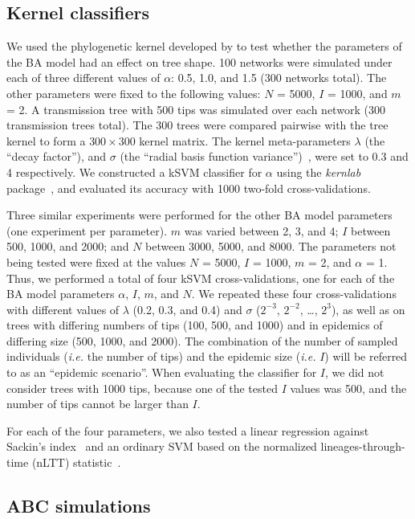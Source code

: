 \documentclass[nogrid]{MBE}
\begin{document}
\subsection{Kernel classifiers}
  
We used the phylogenetic kernel developed by \citet{poon2013mapping} to test
whether the parameters of the BA model had an effect on tree shape. 100
networks were simulated under each of three different values of $\alpha$: 0.5,
1.0, and 1.5 (300 networks total). The other parameters were fixed to the
following values: $N$ = 5000, $I$ = 1000, and $m$ = 2. A transmission tree with
500 tips was simulated over each network (300 transmission trees total). The
300 trees were compared pairwise with the tree kernel to form a $300 \times
300$ kernel matrix. The kernel meta-parameters $\lambda$ (the ``decay
factor''), and $\sigma$ (the ``radial basis function
variance'')~\citep[see][]{poon2013mapping}, were set to 0.3 and 4 respectively.
We constructed a kSVM classifier for $\alpha$ using the \textit{kernlab}
package~\citep{zeileis2004kernlab}, and evaluated its accuracy with 1000
two-fold cross-validations.
  
Three similar experiments were performed for the other BA model parameters (one
experiment per parameter). $m$ was varied between 2, 3, and 4; $I$ between 500,
1000, and 2000; and $N$ between 3000, 5000, and 8000. The parameters not being
tested were fixed at the values $N$ = 5000, $I$ = 1000, $m$ = 2, and $\alpha$ =
1. Thus, we performed a total of four kSVM cross-validations, one for each of
the BA model parameters $\alpha$, $I$, $m$, and $N$. We repeated these four
cross-validations with different values of $\lambda$ (0.2, 0.3, and 0.4) and
$\sigma$ ($2^{-3}$, $2^{-2}$, \ldots, $2^3$), as well as on trees with
differing numbers of tips (100, 500, and 1000) and in epidemics of differing
size (500, 1000, and 2000). The combination of the number of sampled
individuals (\textit{i.e.} the number of tips) and the epidemic size
(\textit{i.e.} $I$) will be referred to as an ``epidemic scenario''. When
evaluating the classifier for $I$, we did not consider trees with 1000 tips,
because one of the tested $I$ values was 500, and the number of tips cannot be
larger than $I$.
  
For each of the four parameters, we also tested a linear regression against
Sackin's index~\citep{shao1990tree} and an ordinary SVM based on the normalized
lineages-through-time (nLTT) statistic~\citep{janzen2015approximate}.
  
\subsection{ABC simulations}
  
\end{document}
